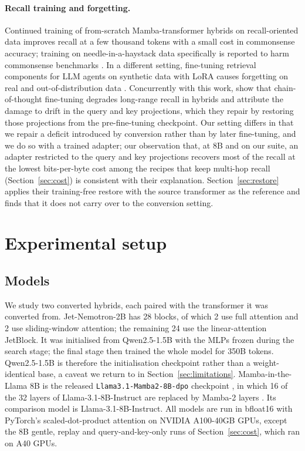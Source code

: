 \documentclass[11pt]{article}
\begin{document}
\paragraph{Recall training and forgetting.} Continued training of from-scratch Mamba-transformer hybrids on recall-oriented data improves recall at a few thousand tokens with a small cost in commonsense accuracy; training on needle-in-a-haystack data specifically is reported to harm commonsense benchmarks \citep{hybridrecall2025}. In a different setting, fine-tuning retrieval components for LLM agents on synthetic data with LoRA causes forgetting on real and out-of-distribution data \citep{syntheticdatahurts2026}. Concurrently with this work, \citet{attentionamnesia2026} show that chain-of-thought fine-tuning degrades long-range recall in hybrids and attribute the damage to drift in the query and key projections, which they repair by restoring those projections from the pre-fine-tuning checkpoint. Our setting differs in that we repair a deficit introduced by conversion rather than by later fine-tuning, and we do so with a trained adapter; our observation that, at 8B and on our suite, an adapter restricted to the query and key projections recovers most of the recall at the lowest bits-per-byte cost among the recipes that keep multi-hop recall (Section~\ref{sec:cost}) is consistent with their explanation. Section~\ref{sec:restore} applies their training-free restore with the source transformer as the reference and finds that it does not carry over to the conversion setting.

\section{Experimental setup}
\label{sec:setup}

\subsection{Models}
We study two converted hybrids, each paired with the transformer it was converted from.
Jet-Nemotron-2B \citep{jetnemotron2025} has 28 blocks, of which 2 use full attention and 2 use sliding-window attention; the remaining 24 use the linear-attention JetBlock. It was initialised from Qwen2.5-1.5B with the MLPs frozen during the search stage; the final stage then trained the whole model for 350B tokens. Qwen2.5-1.5B is therefore the initialisation checkpoint rather than a weight-identical base, a caveat we return to in Section~\ref{sec:limitations}.
Mamba-in-the-Llama 8B is the released \texttt{Llama3.1-Mamba2-8B-dpo} checkpoint \citep{mambainllama2024}, in which 16 of the 32 layers of Llama-3.1-8B-Instruct \citep{llama3_2024} are replaced by Mamba-2 layers \citep{mamba2_2024}. Its comparison model is Llama-3.1-8B-Instruct.
All models are run in bfloat16 with PyTorch's scaled-dot-product attention on NVIDIA A100-40GB GPUs, except the 8B gentle, replay and query-and-key-only runs of Section~\ref{sec:cost}, which ran on A40 GPUs.
\end{document}
